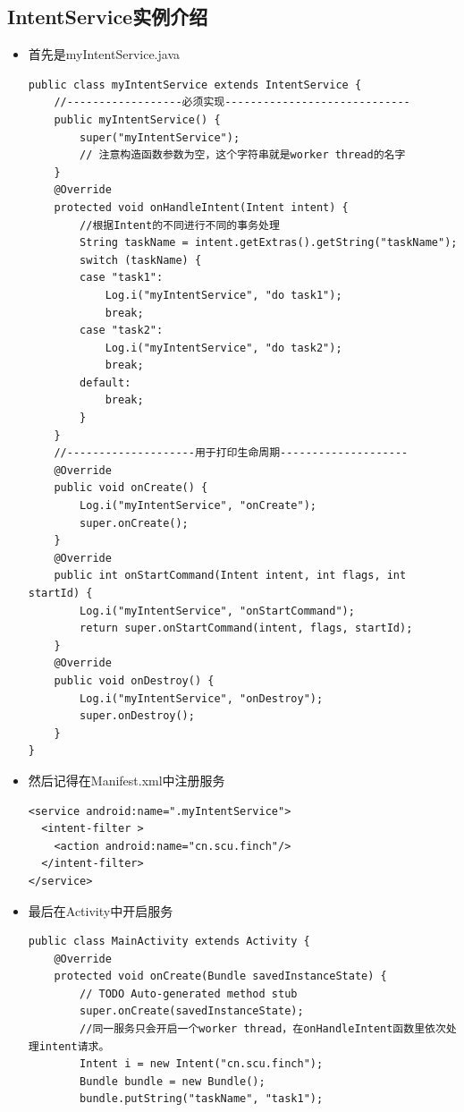 \documentclass[9pt, b5paper]{article}
\begin{document}
\subsection{IntentService实例介绍}
\label{sec-4-3}
\begin{itemize}
\item 首先是myIntentService.java
\begin{verbatim}
public class myIntentService extends IntentService {
    //------------------必须实现-----------------------------
    public myIntentService() {
        super("myIntentService");
        // 注意构造函数参数为空，这个字符串就是worker thread的名字
    }
    @Override
    protected void onHandleIntent(Intent intent) {
        //根据Intent的不同进行不同的事务处理 
        String taskName = intent.getExtras().getString("taskName");  
        switch (taskName) {
        case "task1":
            Log.i("myIntentService", "do task1");
            break;
        case "task2":
            Log.i("myIntentService", "do task2");
            break;
        default:
            break;
        }        
    }
    //--------------------用于打印生命周期--------------------    
    @Override
    public void onCreate() {
        Log.i("myIntentService", "onCreate");
        super.onCreate();
    }
    @Override
    public int onStartCommand(Intent intent, int flags, int startId) {
        Log.i("myIntentService", "onStartCommand");
        return super.onStartCommand(intent, flags, startId);
    }
    @Override
    public void onDestroy() {
        Log.i("myIntentService", "onDestroy");
        super.onDestroy();
    }
}
\end{verbatim}
\item 然后记得在Manifest.xml中注册服务
\begin{verbatim}
<service android:name=".myIntentService">
  <intent-filter >  
    <action android:name="cn.scu.finch"/>  
  </intent-filter>     
</service>
\end{verbatim}
\item 最后在Activity中开启服务
\begin{verbatim}
public class MainActivity extends Activity {
    @Override
    protected void onCreate(Bundle savedInstanceState) {
        // TODO Auto-generated method stub
        super.onCreate(savedInstanceState);
        //同一服务只会开启一个worker thread，在onHandleIntent函数里依次处理intent请求。
        Intent i = new Intent("cn.scu.finch");  
        Bundle bundle = new Bundle();  
        bundle.putString("taskName", "task1");  

\end{verbatim}
\end{itemize}
\end{document}
